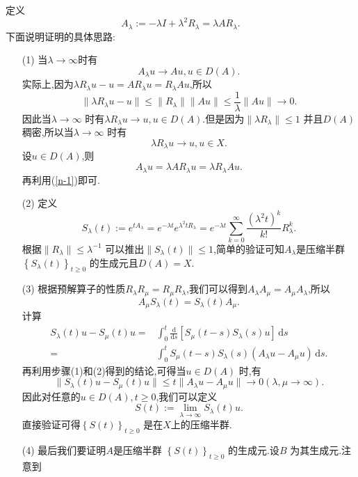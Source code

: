 定义
 \[
A_\lambda := -\lambda I +\lambda ^2 R_\lambda =\lambda A R_\lambda.
\]
下面说明证明的具体思路:
\begin{enumerate}
  \item [(1)] 当$\lambda\to \infty$时有
    \[
    A_\lambda u\to Au,u\in D(A).
  \]
  实际上,因为$\lambda R_\lambda u - u=AR_\lambda u =R_\lambda A u$,所以
    \[
    \|\lambda R_\lambda u -u\|\le \|R_\lambda\|\|Au\|\le \frac{1}{\lambda}\|Au\|\to 0.
    \] 
    因此当$\lambda\to \infty$ 时有$\lambda R_\lambda u\to u,u\in D(A)$.但是因为$\|\lambda R_\lambda\|\le 1$ 
    并且$D(A)$稠密,所以当$\lambda\to \infty$ 时有
    \begin{equation}\label{n-1}
    \lambda R_\lambda u \to u, u\in X.
  \end{equation} 
    设$u\in D(A)$,则
    \[
    A_\lambda u =\lambda AR_\lambda u=\lambda R_\lambda Au.
    \] 
   再利用(\ref{n-1})即可.
  \item [(2)] 定义
    \[
      S_\lambda(t):=e^{t A_\lambda}=e^{-\lambda t}e^{\lambda^2 t R_\lambda}=e^{-\lambda t}\sum_{k=0}^{\infty} \frac{(\lambda^2 t)^{k}}{k!}R_\lambda^{k}.
    \] 根据$\|R_\lambda\|\le \lambda^{-1}$ 可以推出$\|S_\lambda (t)\|\le 1$,简单的验证可知$A_\lambda$是压缩半群$\left\{S_\lambda(t)\right\} _{t\ge 0}$ 的生成元且$D(A)=X$.
  \item [(3)] 根据预解算子的性质$R_\lambda R_\mu =R_\mu R_\lambda$,我们可以得到$A_\lambda A_\mu = A_\mu A_\lambda$,所以
    \[
      A_\mu S_\lambda(t)=S_\lambda (t)A_\mu.
    \] 
    计算
    \begin{equation}
      \begin{aligned}
	S_\lambda(t)u-S_\mu(t)u=& \int_0^{t}\frac{\mathrm{d}}{\mathrm{d}s}[S_\mu(t-s)S_\lambda(s)u]\,\mathrm{d}s\\
	=& \int_0^{t}S_\mu(t-s)S_\lambda(s)(A_\lambda u-A_\mu u)\,\mathrm{d}s
      .\end{aligned}
    \end{equation}
    再利用步骤(1)和(2)得到的结论,可得当$u \in D(A)$ 时,有
  \[
    \|S_\lambda(t)u-S_\mu(t)u\|\le t \|A_\lambda u-A_\mu u\|\to 0 \left(\lambda,\mu\to \infty  \right) .
  \] 
  因此对任意的$u\in D(A),t\ge 0$,我们可以定义
  \begin{equation}
    S(t):=\lim_{\lambda\to \infty}S_\lambda(t)u.
  \end{equation}
  直接验证可得$\left\{S(t)\right\} _{t\ge 0}$ 是在$X$上的压缩半群.
  \item[(4)] 最后我们要证明$A$是压缩半群 $\left\{S(t)\right\} _{t\ge 0}$ 的生成元.设$B$ 为其生成元.注意到
    \begin{equation}

\end{equation}
\end{enumerate}
